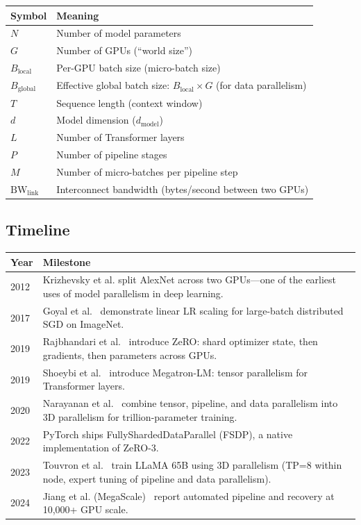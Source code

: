 \begin{center}
\begin{tabularx}{\textwidth}{@{}lX@{}}
\toprule
\textbf{Symbol} & \textbf{Meaning} \\
\midrule
$N$ & Number of model parameters \\
$G$ & Number of GPUs (``world size'') \\
$B_{\text{local}}$ & Per-GPU batch size (micro-batch size) \\
$B_{\text{global}}$ & Effective global batch size: $B_{\text{local}} \times G$ (for data parallelism) \\
$T$ & Sequence length (context window) \\
$d$ & Model dimension ($d_{\text{model}}$) \\
$L$ & Number of Transformer layers \\
$P$ & Number of pipeline stages \\
$M$ & Number of micro-batches per pipeline step \\
$\text{BW}_{\text{link}}$ & Interconnect bandwidth (bytes/second between two GPUs) \\
\bottomrule
\end{tabularx}
\end{center}


\subsection*{Timeline}

\begin{center}
\begin{tabularx}{\textwidth}{@{}lX@{}}
\toprule
\textbf{Year} & \textbf{Milestone} \\
\midrule
2012 & Krizhevsky et al. split AlexNet across two GPUs---one of the earliest uses of model parallelism in deep learning. \\
2017 & Goyal et al.~\cite{goyal2017imagenet} demonstrate linear LR scaling for large-batch distributed SGD on ImageNet. \\
2019 & Rajbhandari et al.~\cite{rajbhandari2020zero} introduce ZeRO: shard optimizer state, then gradients, then parameters across GPUs. \\
2019 & Shoeybi et al.~\cite{shoeybi2019megatron} introduce Megatron-LM: tensor parallelism for Transformer layers. \\
2020 & Narayanan et al.~\cite{narayanan2021efficient} combine tensor, pipeline, and data parallelism into 3D parallelism for trillion-parameter training. \\
2022 & PyTorch ships FullyShardedDataParallel (FSDP), a native implementation of ZeRO-3. \\
2023 & Touvron et al.~\cite{touvron2023llama} train LLaMA 65B using 3D parallelism (TP=8 within node, expert tuning of pipeline and data parallelism). \\
2024 & Jiang et al. (MegaScale)~\cite{jiang2024megascale} report automated pipeline and recovery at 10,000+ GPU scale. \\
\bottomrule
\end{tabularx}
\end{center}


